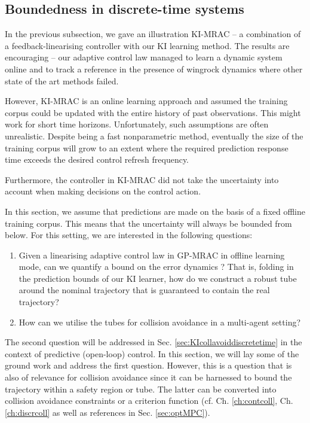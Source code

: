 

\subsection{Boundedness in discrete-time systems}
\label{sec:KIMRACstabbounds}

In the previous subsection, we gave an illustration KI-MRAC -- a combination of a feedback-linearising controller with our KI learning method. The results are encouraging -- our adaptive control law managed to learn a dynamic system online and to track a reference in the presence of wingrock dynamics where other state of the art methods failed. 

However, KI-MRAC is an online learning approach and assumed the training corpus could be updated with the entire history of past observations. This might work for short time horizons. Unfortunately, such assumptions are often unrealistic. Despite being a fast nonparametric method, eventually the size of the training corpus will grow to an extent where the required prediction response time exceeds the desired control refresh frequency. 

Furthermore, the controller in KI-MRAC did not take the uncertainty into account when making decisions on the control action. 


In this section, we assume that predictions are made on the basis of a fixed offline training corpus.
This means that the uncertainty will always be bounded from below. 
For this setting, we are interested in the following questions:
\begin{enumerate}
\item 
Given a linearising adaptive control law in GP-MRAC in offline learning mode, can we quantify a bound on the error dynamics ? That is, folding in the prediction bounds of our KI learner, how do we construct a robust tube around the nominal trajectory that is guaranteed to contain the real trajectory? 
\item 
How can we utilise the tubes for collision avoidance in a multi-agent setting?
\end{enumerate}
The second question will be addressed in Sec. \ref{sec:KIcollavoiddiscretetime} in the context of predictive (open-loop) control. In this section, we will lay some of the ground work and address the first question.
However, this is a question that is also of relevance for collision avoidance since it can be harnessed to bound the trajectory within a safety region or tube. The latter can be converted into collision avoidance constraints or a criterion function (cf.  Ch. \ref{ch:contcoll}, Ch. \ref{ch:discrcoll} as well as references in Sec. \ref{sec:optMPC}).




